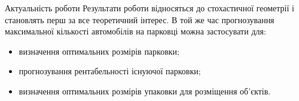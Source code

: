 \begin{frame}{Актуальність роботи}
	\manimate
	\justifying
	Результати роботи відносяться до стохастичної геометрії і становлять перш за все теоретичний інтерес. В той же час прогнозування максимальної кількості автомобілів на парковці можна застосувати для:
	\begin{itemize}
		\item визначення оптимальних розмірів парковки;
		\item прогнозування рентабельності існуючої парковки;
		\item визначення оптимальних розмірів упаковки для розміщення об'єктів.
	\end{itemize}
\end{frame}
